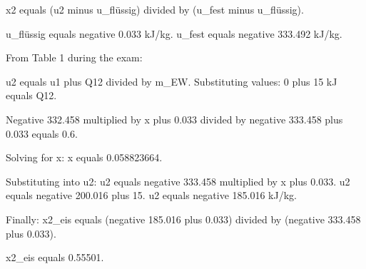 x2 equals (u2 minus u_flüssig) divided by (u_fest minus u_flüssig).  

u_flüssig equals negative 0.033 kJ/kg.  
u_fest equals negative 333.492 kJ/kg.  

From Table 1 during the exam:  

u2 equals u1 plus Q12 divided by m_EW.  
Substituting values:  
0 plus 15 kJ equals Q12.  

Negative 332.458 multiplied by x plus 0.033 divided by negative 333.458 plus 0.033 equals 0.6.  

Solving for x:  
x equals 0.058823664.  

Substituting into u2:  
u2 equals negative 333.458 multiplied by x plus 0.033.  
u2 equals negative 200.016 plus 15.  
u2 equals negative 185.016 kJ/kg.  

Finally:  
x2_eis equals (negative 185.016 plus 0.033) divided by (negative 333.458 plus 0.033).  

x2_eis equals 0.55501.